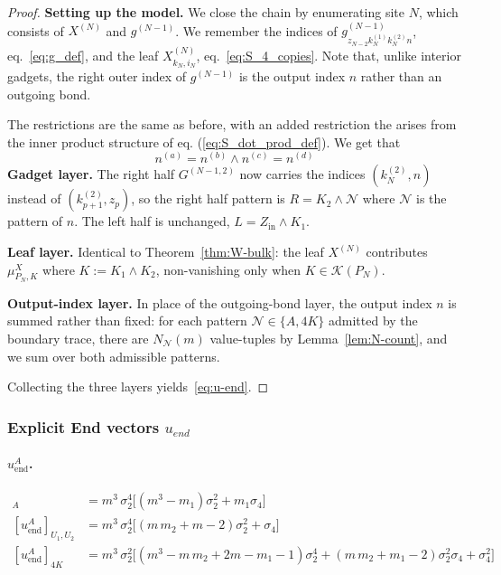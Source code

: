 \documentclass[12pt,a4paper]{article}
\begin{document}
\begin{proof}
\textbf{Setting up the model.} 
We close the chain by enumerating site $N$, which consists of $X^{(N)}$ 
and $g^{(N-1)}$. We remember the indices of $g^{(N-1)}_{z_{N-2} k^{(1)}_{N} k^{(2)}_{N} n}$, 
eq.~\eqref{eq:g_def}, and the leaf $X^{(N)}_{k_{N}, i_{N}}$, eq.~\eqref{eq:S_4_copies}. 
Note that, unlike interior gadgets, the right outer index of $g^{(N-1)}$ 
is the output index $n$ rather than an outgoing bond.

The restrictions are the same as before, with an added restriction the arises from the inner product structure of eq. (\ref{eq:S_dot_prod_def}). We get that $$n^{(a)}=n^{(b)}\land n^{(c)}=n^{(d)}$$
\smallskip\noindent\textbf{Gadget layer.}
The right half $G^{(N-1, 2)}$ now carries the indices $(k^{(2)}_{N}, n)$ 
instead of $(k^{(2)}_{p+1}, z_{p})$, so the right half pattern is 
$R = K_{2} \wedge \mathcal{N}$ where $\mathcal{N}$ is the pattern of $n$. 
The left half is unchanged, $L = Z_{\mathrm{in}} \wedge K_{1}$.

\smallskip\noindent\textbf{Leaf layer.}
Identical to Theorem~\ref{thm:W-bulk}: the leaf $X^{(N)}$ contributes 
$\mu^{X}_{P_{N}, K}$ where $K:= K_{1} \wedge K_{2}$, non-vanishing only 
when $K \in \mathcal{K}(P_{N})$.

\smallskip\noindent\textbf{Output-index layer.}
In place of the outgoing-bond layer, the output index $n$ is summed 
rather than fixed: for each pattern $\mathcal{N} \in \{A, 4K\}$ admitted 
by the boundary trace, there are $N_{\mathcal{N}}(m)$ value-tuples 
by Lemma~\ref{lem:N-count}, and we sum over both admissible patterns.

\medskip
Collecting the three layers yields~\eqref{eq:u-end}.
\end{proof}
\subsubsection{ Explicit End vectors $u_{end}$}
\paragraph{$u^{A}_{\mathrm{end}}$.}
\begin{align*}
[u^{A}_{\mathrm{end}}]_{A}
  &= m^{3}\,\sigma_{2}^{4}\bigl[(m^{3} - m_{1})\sigma_{2}^{2} + m_{1}\sigma_{4}\bigr]\\
[u^{A}_{\mathrm{end}}]_{U_{1}, U_{2}}
  &= m^{3}\,\sigma_{2}^{4}\bigl[(m\,m_{2} + m - 2)\sigma_{2}^{2} + \sigma_{4}\bigr]\\
[u^{A}_{\mathrm{end}}]_{4K}
  &= m^{3}\,\sigma_{2}^{2}\bigl[
       (m^{3} - m\,m_{2} + 2m - m_{1} - 1)\sigma_{2}^{4}
       + (m\,m_{2} + m_{1} - 2)\sigma_{2}^{2}\sigma_{4} + \sigma_{4}^{2}\bigr]
\end{align*}
\end{document}
